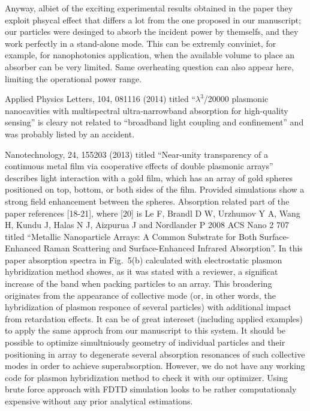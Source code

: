 \documentclass[a4paper]{article}
\begin{document}
Anyway, albiet of the exciting experimental results obtained in the
paper they exploit phsycal effect that differs a lot from the one
proposed in our manuscript; our particles were desinged to absorb the
incident power by themselfs, and they work perfectly in a stand-alone
mode.  This can be extremly conviniet, for example, for nanophotonics
application, when the available volume to place an absorber can be
very limited. Same overheating question can also appear here, limiting the
operational power range.



Applied Physics Letters, 104, 081116 (2014) titled ``$\lambda^3$/20000
plasmonic nanocavities with multispectral ultra-narrowband absorption
for high-quality sensing'' is cleary not related to ``broadband light
coupling and confinement'' and was
probably listed by an accident.

Nanotechnology, 24, 155203 (2013) titled ``Near-unity transparency of
a continuous metal film via cooperative effects of double plasmonic
arrays'' describes light interaction with a gold film, which has an
array of gold spheres positioned on top, bottom, or both sides of the
film.  Provided simulations show a strong field enhancement between
the spheres. Absorption related part of the paper references [18-21],
where [20] is Le F, Brandl D W, Urzhumov Y A, Wang H, Kundu J, Halas N
J, Aizpurua J and Nordlander P 2008 ACS Nano 2 707 titled ``Metallic
Nanoparticle Arrays: A Common Substrate for Both Surface-Enhanced
Raman Scattering and Surface-Enhanced Infrared Absorption''.  In this
paper absorption spectra in Fig.~5(b) calculated with electrostatic
plasmon hybridization method showes, as it was stated with a reviewer,
a significat increase of the band when packing particles to an
array. This broadering originates from the appearance of collective
mode (or, in other words, the hybridization of plasmon responce of
several particles) with additional impact from retardation effects. It
can be of great intereset (including applied examples) to apply the
same approch from our manuscript to this system. It should be possible
to optimize simultniously geometry of individual particles and their
positioning in array to degenerate several absorption resonances of
such collective modes in order to achieve superabsorption. However, we
do not have any working code for plasmon hybridization method to check
it with our optimizer. Using brute force approach with FDTD simulation
looks to be rather computationaly expensive without any prior
analytical estimations.
\end{document}
